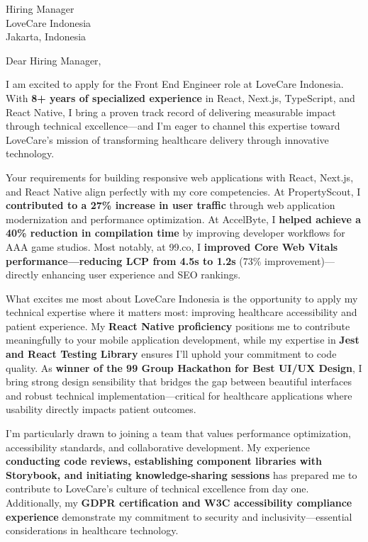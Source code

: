 \documentclass[11pt,a4paper]{letter}
\begin{document}
\begin{letter}{%
    Hiring Manager \\
    LoveCare Indonesia \\
    Jakarta, Indonesia
}

\opening{Dear Hiring Manager,}

I am excited to apply for the Front End Engineer role at LoveCare Indonesia. With \textbf{8+ years of specialized experience} in React, Next.js, TypeScript, and React Native, I bring a proven track record of delivering measurable impact through technical excellence---and I'm eager to channel this expertise toward LoveCare's mission of transforming healthcare delivery through innovative technology.

\vspace{10pt}

Your requirements for building responsive web applications with React, Next.js, and React Native align perfectly with my core competencies. At PropertyScout, I \textbf{contributed to a 27\% increase in user traffic} through web application modernization and performance optimization. At AccelByte, I \textbf{helped achieve a 40\% reduction in compilation time} by improving developer workflows for AAA game studios. Most notably, at 99.co, I \textbf{improved Core Web Vitals performance---reducing LCP from 4.5s to 1.2s} (73\% improvement)---directly enhancing user experience and SEO rankings.

\vspace{10pt}

What excites me most about LoveCare Indonesia is the opportunity to apply my technical expertise where it matters most: improving healthcare accessibility and patient experience. My \textbf{React Native proficiency} positions me to contribute meaningfully to your mobile application development, while my expertise in \textbf{Jest and React Testing Library} ensures I'll uphold your commitment to code quality. As \textbf{winner of the 99 Group Hackathon for Best UI/UX Design}, I bring strong design sensibility that bridges the gap between beautiful interfaces and robust technical implementation---critical for healthcare applications where usability directly impacts patient outcomes.

\vspace{10pt}

I'm particularly drawn to joining a team that values performance optimization, accessibility standards, and collaborative development. My experience \textbf{conducting code reviews, establishing component libraries with Storybook, and initiating knowledge-sharing sessions} has prepared me to contribute to LoveCare's culture of technical excellence from day one. Additionally, my \textbf{GDPR certification and W3C accessibility compliance experience} demonstrate my commitment to security and inclusivity---essential considerations in healthcare technology.


\end{letter}
\end{document}
